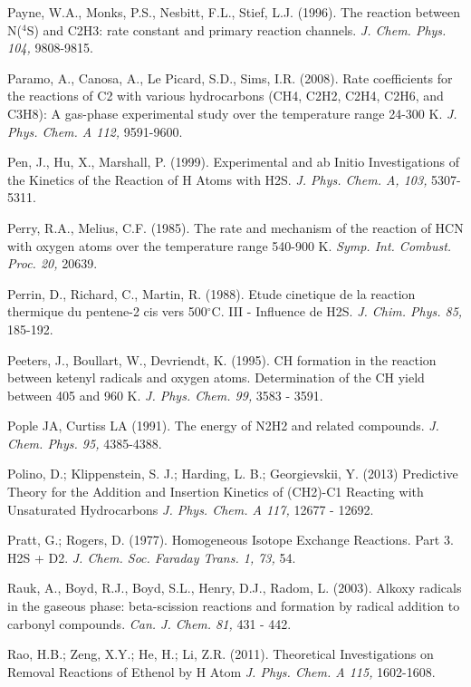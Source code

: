 \documentclass[12pt,landscape]{article}
\newcounter{reaction}
\begin{document}
Payne, W.A., Monks, P.S., Nesbitt, F.L., Stief, L.J. (1996). The reaction between N($^4$S) and C2H3: rate constant and primary reaction channels.  {\em J. Chem. Phys. 104,} 9808-9815.

Paramo, A., Canosa, A., Le Picard, S.D., Sims, I.R. (2008). Rate coefficients for the reactions of C2 with various hydrocarbons (CH4, C2H2, C2H4, C2H6, and C3H8): A gas-phase experimental study over the temperature range 24-300 K.  {\em J. Phys. Chem. A 112, } 9591-9600.


Pen, J., Hu, X., Marshall, P. (1999).  Experimental and ab Initio Investigations of the Kinetics of the Reaction of H Atoms with H2S.  {\em J. Phys. Chem. A, 103,} 5307-5311.

Perry, R.A., Melius, C.F. (1985).  The rate and mechanism of the reaction of HCN with oxygen atoms over the temperature range 540-900 K.  {\em Symp. Int. Combust. Proc. 20,} 20639.

Perrin, D., Richard, C., Martin, R. (1988). Etude cinetique de la reaction thermique du pentene-2 cis vers 500$^{\circ}$C. III - Influence de H2S. {\em  J. Chim. Phys. 85,} 185-192.

Peeters, J., Boullart, W., Devriendt, K. (1995).  CH formation in the reaction between ketenyl radicals and oxygen atoms. Determination of the CH yield between 405 and 960 K.  {\em J. Phys. Chem. 99,} 3583 - 3591.

Pople JA, Curtiss LA (1991). The energy of N2H2 and related compounds.  {\em J. Chem. Phys. 95,} 4385-4388.

Polino, D.; Klippenstein, S. J.; Harding, L. B.; Georgievskii, Y. (2013)
Predictive Theory for the Addition and Insertion Kinetics of (CH2)-C1 Reacting with Unsaturated Hydrocarbons
{\em J. Phys. Chem. A  117,} 12677 - 12692.

Pratt, G.; Rogers, D. (1977). Homogeneous Isotope Exchange Reactions. Part 3. H2S + D2.  {\em J. Chem. Soc. Faraday Trans. 1, 73,} 54.

Rauk, A., Boyd, R.J., Boyd, S.L., Henry, D.J., Radom, L. (2003).  Alkoxy radicals in the gaseous phase: beta-scission reactions and formation by radical addition to carbonyl compounds.  {\em Can. J. Chem. 81,} 431 - 442.

 Rao, H.B.; Zeng, X.Y.; He, H.; Li, Z.R. (2011).
Theoretical Investigations on Removal Reactions of Ethenol by H Atom
{\em J. Phys. Chem. A 115,} 1602-1608.
\end{document}
